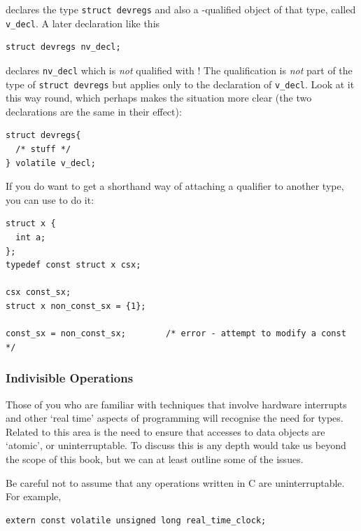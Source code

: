    declares the type \texttt{struct devregs} and also
    a \volatile-qualified object of that type, called
    \texttt{v\_decl}. A later declaration like this


\begin{Verbatim}
struct devregs nv_decl;
\end{Verbatim}

   declares \texttt{nv\_decl} which is \textit{not} qualified with
    \volatile{}! The qualification is \textit{not} part of the
    type of \texttt{struct devregs} but applies only to the declaration
    of \texttt{v\_decl}. Look at it this way round, which perhaps makes
    the situation more clear (the two declarations are the same in their
    effect):


\begin{Verbatim}
struct devregs{
  /* stuff */
} volatile v_decl;
\end{Verbatim}

    If you do want to get a shorthand way of attaching a qualifier to
    another type, you can use \typedef{} to do it:


\begin{Verbatim}
struct x {
  int a;
};
typedef const struct x csx;

csx const_sx;
struct x non_const_sx = {1};

const_sx = non_const_sx;        /* error - attempt to modify a const */
\end{Verbatim}

   \subsubsection{Indivisible Operations}
    

    Those of you who are familiar with techniques that involve hardware
     interrupts and other `real time' aspects of programming will
     recognise the need for \volatile{} types. Related to this
     area is the need to ensure that accesses to data objects are
     `atomic', or uninterruptable. To discuss this is any depth would
     take us beyond the scope of this book, but we can at least outline some
     of the issues.


    Be careful not to assume that any operations written in C are
     uninterruptable. For example,


\begin{Verbatim}
extern const volatile unsigned long real_time_clock;
\end{Verbatim}


